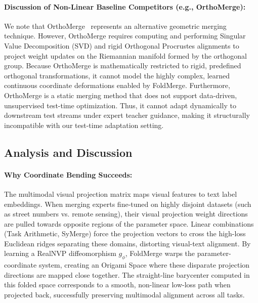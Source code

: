 \paragraph{Discussion of Non-Linear Baseline Competitors (e.g., OrthoMerge):}
We note that OrthoMerge~\cite{yang2026orthomerge} represents an alternative geometric merging technique. 
However, OrthoMerge requires computing and performing Singular Value Decomposition (SVD) and rigid Orthogonal Procrustes alignments to project weight updates on the Riemannian manifold formed by the orthogonal group. 
Because OrthoMerge is mathematically restricted to rigid, predefined orthogonal transformations, it cannot model the highly complex, learned continuous coordinate deformations enabled by FoldMerge. 
Furthermore, OrthoMerge is a static merging method that does not support data-driven, unsupervised test-time optimization. 
Thus, it cannot adapt dynamically to downstream test streams under expert teacher guidance, making it structurally incompatible with our test-time adaptation setting.

\subsection{Analysis and Discussion}
\paragraph{Why Coordinate Bending Succeeds:}
The multimodal visual projection matrix maps visual features to text label embeddings. 
When merging experts fine-tuned on highly disjoint datasets (such as street numbers vs. remote sensing), their visual projection weight directions are pulled towards opposite regions of the parameter space. 
Linear combinations (Task Arithmetic, SyMerge) force the projection vectors to cross the high-loss Euclidean ridges separating these domains, distorting visual-text alignment. 
By learning a RealNVP diffeomorphism $g_\phi$, FoldMerge warps the parameter-coordinate system, creating an Origami Space where these disparate projection directions are mapped close together. 
The straight-line barycenter computed in this folded space corresponds to a smooth, non-linear low-loss path when projected back, successfully preserving multimodal alignment across all tasks.

